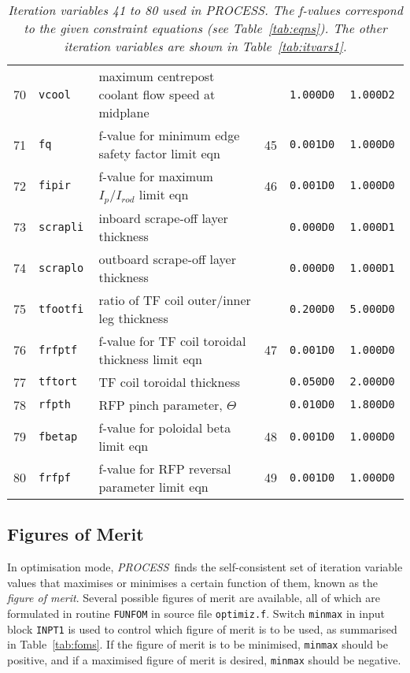 \documentclass[11pt,a4paper]{report}
\makeatletter
\newcommand{\PS}{\mbox{\it PROCESS\/ }}
\newcommand{\PSD}{\mbox{\it PROCESS}\@.\/ }
\makeatother
\begin{document}
\begin{table}[tbph]
\begin{center}
\begin{tabular}{||c|l|l|c|c|c||}
70  & \tt vcool	      & maximum centrepost coolant flow speed at midplane       &           & \tt 1.000D0  & \tt 1.000D2 \\
71  & \tt fq          & f-value for minimum edge safety factor limit eqn        & 45        & \tt 0.001D0  & \tt 1.000D0 \\
72  & \tt fipir       & f-value for maximum $I_p/I_{rod}$ limit eqn             & 46        & \tt 0.001D0  & \tt 1.000D0 \\
73  & \tt scrapli     & inboard scrape-off layer thickness                      &           & \tt 0.000D0  & \tt 1.000D1 \\
74  & \tt scraplo     & outboard scrape-off layer thickness                     &           & \tt 0.000D0  & \tt 1.000D1 \\
75  & \tt tfootfi     & ratio of TF coil outer/inner leg thickness              &           & \tt 0.200D0  & \tt 5.000D0 \\
76  & \tt frfptf      & f-value for TF coil toroidal thickness limit eqn        & 47        & \tt 0.001D0  & \tt 1.000D0 \\
77  & \tt tftort      & TF coil toroidal thickness                              &           & \tt 0.050D0  & \tt 2.000D0 \\
78  & \tt rfpth       & RFP pinch parameter, $\Theta$                           &           & \tt 0.010D0  & \tt 1.800D0 \\
79  & \tt fbetap      & f-value for poloidal beta limit eqn                     & 48        & \tt 0.001D0  & \tt 1.000D0 \\
80  & \tt frfpf       & f-value for RFP reversal parameter limit eqn            & 49        & \tt 0.001D0  & \tt 1.000D0 \\ \hline
\end{tabular}
\end{center}
\caption[TABLE_VARS2]{{\it
Iteration variables 41 to 80 used in \PSD The f-values correspond to the
given constraint equations (see Table~\ref{tab:eqns}). The other iteration
variables are shown in Table~\ref{tab:itvars1}. }}
\label{tab:itvars2}
\end{table}
\normalsize


\subsection{Figures of Merit}
\label{sec:foms}

In optimisation mode, \PS finds the self-consistent set of iteration variable
values that maximises or minimises a certain function of them, known as the
{\em figure of merit}. Several possible figures of merit are available, all of
which are formulated in routine {\tt FUNFOM} in source file {\tt optimiz.f}.
Switch {\tt minmax} in input block {\tt INPT1} is used to control which figure
of merit is to be used, as summarised in Table~\ref{tab:foms}. If the figure
of merit is to be minimised, {\tt minmax} should be positive, and if a
maximised figure of merit is desired, {\tt minmax} should be negative.
\end{document}
